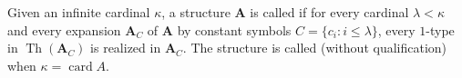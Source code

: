 Given an infinite cardinal $\kappa$, a structure $\mathbf{A}$ is called  if for every cardinal $\lambda < \kappa$ and every expansion $\mathbf{A}_C$ of $\mathbf{A}$ by constant symbols $C = \{c_i : i \leq \lambda\}$, every $1$-type in $\operatorname{Th}(\mathbf{A}_C)$ is realized in $\mathbf{A}_C$. The structure is called  (without qualification) when $\kappa = \operatorname{card} A$.
